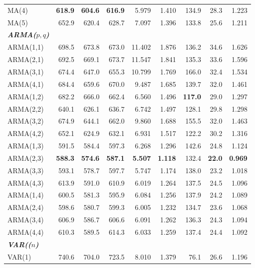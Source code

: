 \documentclass{Configuration_Files/PoliMi3i_thesis}
\begin{document}
\begin{table}[H]
\begin{tabular}{@{}lrrrrrrrr@{}}
    MA(4)  & \textbf{618.9} & \textbf{604.6} & \textbf{616.9} & 5.979  & 1.410 & 134.9 & 28.3 & 1.223 \\
    MA(5)  & 652.9 & 620.4 & 628.7 & 7.097  & 1.396 & 133.8 & 25.6 & 1.211 \\
    \midrule
\textbf{\textit{ARMA($p,q$)}} \\
    ARMA(1,1) & 698.5 & 673.8 & 673.0 & 11.402 & 1.876 & 136.2 & 34.6 & 1.626 \\
    ARMA(2,1) & 692.5 & 669.1 & 673.7 & 11.547 & 1.841 & 135.3 & 33.6 & 1.596 \\
    ARMA(3,1) & 674.4 & 647.0 & 655.3 & 10.799 & 1.769 & 166.0 & 32.4 & 1.534 \\
    ARMA(4,1) & 684.4 & 659.6 & 670.0 & 9.487  & 1.685 & 139.7 & 32.0 & 1.461 \\
    ARMA(1,2) & 682.2 & 666.0 & 662.4 & 6.560  & 1.496 & \textbf{117.0} & 29.0 & 1.297 \\
    ARMA(2,2) & 640.1 & 626.1 & 636.7 & 6.742  & 1.497 & 128.1 & 29.8 & 1.298 \\
    ARMA(3,2) & 674.9 & 644.1 & 662.0 & 9.860  & 1.688 & 155.5 & 32.0 & 1.463 \\
    ARMA(4,2) & 652.1 & 624.9 & 632.1 & 6.931  & 1.517 & 122.2 & 30.2 & 1.316 \\
    ARMA(1,3) & 591.5 & 584.4 & 597.3 & 6.268  & 1.296 & 142.6 & 24.8 & 1.124 \\
  \rowcolor{gray!20}
    ARMA(2,3) & \textbf{588.3} & \textbf{574.6} & \textbf{587.1} & \textbf{5.507}  & \textbf{1.118} & 132.4 & \textbf{22.0} & \textbf{0.969} \\
    ARMA(3,3) & 593.1 & 578.7 & 597.7 & 5.747  & 1.174 & 138.0 & 23.2 & 1.018 \\
    ARMA(4,3) & 613.9 & 591.0 & 610.9 & 6.019  & 1.264 & 137.5 & 24.5 & 1.096 \\
    ARMA(1,4) & 600.5 & 581.3 & 595.9 & 6.084  & 1.256 & 137.9 & 24.2 & 1.089 \\
    ARMA(2,4) & 598.6 & 580.7 & 599.3 & 6.005  & 1.232 & 134.7 & 23.6 & 1.068 \\
    ARMA(3,4) & 606.9 & 586.7 & 606.6 & 6.091  & 1.262 & 136.3 & 24.3 & 1.094 \\
    ARMA(4,4) & 610.3 & 589.5 & 614.3 & 6.033  & 1.259 & 137.4 & 24.4 & 1.092 \\
    \midrule
    \midrule
\textbf{\textit{VAR(($n$)}}\\
    VAR(1)
      & 740.6 & 704.0 & 723.5 & 8.010 & 1.379 & 76.1 & 26.6 & 1.196 \\
    \bottomrule
  \end{tabular}
\end{table}
\label{GDP_TABLE}
\end{document}

